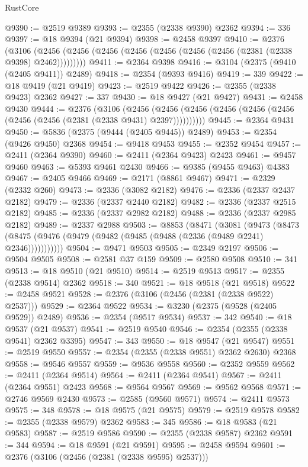\begin{lexlean}{RustCore}
\begin{coremodule}
@9390 := @2519 @9389
@9393 := @2355 (@2338 @9390) @2362
@9394 := 336
@9397 := @18 @9394 (@21 @9394)
@9398 := @2458 @9397
@9410 := @2376
    (@3106 (@2456 (@2456 (@2456 (@2456 (@2456 (@2456 (@2456 (@2381 (@2338 @9398) @2462)))))))))
@9411 := @2364 @9398
@9416 := @3104 (@2375 (@9410 (@2405 @9411)) @2489)
@9418 := @2354 (@9393 @9416)
@9419 := 339
@9422 := @18 @9419 (@21 @9419)
@9423 := @2519 @9422
@9426 := @2355 (@2338 @9423) @2362
@9427 := 337
@9430 := @18 @9427 (@21 @9427)
@9431 := @2458 @9430
@9444 := @2376
    (@3106
      (@2456 (@2456 (@2456 (@2456 (@2456 (@2456 (@2456 (@2456 (@2381 (@2338 @9431) @2397))))))))))
@9445 := @2364 @9431
@9450 := @5836 (@2375 (@9444 (@2405 @9445)) @2489)
@9453 := @2354 (@9426 @9450) @2368
@9454 := @9418 @9453
@9455 := @2352 @9454
@9457 := @2411 (@2364 @9390)
@9460 := @2411 (@2364 @9423) @2423
@9461 := @9457 @9460
@9463 := @5393 @9461 @2430
@9466 := @9385 (@9455 @9463) @4383
@9467 := @2405 @9466
@9469 := @2171 (@8861 @9467)
@9471 := @2329 (@2332 @260)
@9473 := @2336 (@3082 @2182)
@9476 := @2336 (@2337 @2437 @2182)
@9479 := @2336 (@2337 @2440 @2182)
@9482 := @2336 (@2337 @2515 @2182)
@9485 := @2336 (@2337 @2982 @2182)
@9488 := @2336 (@2337 @2985 @2182)
@9489 := @2337 @2988
@9503 := @8853
    (@8471
      (@3081
        (@9473
          (@8473 (@8475 (@9476 (@9479 (@9482 (@9485 (@9488 (@2336 (@9489 @2241) @2346)))))))))))
@9504 := @9471 @9503
@9505 := @2349 @2197
@9506 := @9504 @9505
@9508 := @2581 @37 @159
@9509 := @2580 @9508
@9510 := 341
@9513 := @18 @9510 (@21 @9510)
@9514 := @2519 @9513
@9517 := @2355 (@2338 @9514) @2362
@9518 := 340
@9521 := @18 @9518 (@21 @9518)
@9522 := @2458 @9521
@9528 := @2376 (@3106 (@2456 (@2381 (@2338 @9522) @2537)))
@9529 := @2364 @9522
@9534 := @3230 (@2375 (@9528 (@2405 @9529)) @2489)
@9536 := @2354 (@9517 @9534)
@9537 := 342
@9540 := @18 @9537 (@21 @9537)
@9541 := @2519 @9540
@9546 := @2354 (@2355 (@2338 @9541) @2362 @3395)
@9547 := 343
@9550 := @18 @9547 (@21 @9547)
@9551 := @2519 @9550
@9557 := @2354 (@2355 (@2338 @9551) @2362 @2630) @2368
@9558 := @9546 @9557
@9559 := @9536 @9558
@9560 := @2352 @9559
@9562 := @2411 (@2364 @9514)
@9564 := @2411 (@2364 @9541)
@9567 := @2411 (@2364 @9551) @2423
@9568 := @9564 @9567
@9569 := @9562 @9568
@9571 := @2746 @9569 @2430
@9573 := @2585 (@9560 @9571)
@9574 := @2411 @9573
@9575 := 348
@9578 := @18 @9575 (@21 @9575)
@9579 := @2519 @9578
@9582 := @2355 (@2338 @9579) @2362
@9583 := 345
@9586 := @18 @9583 (@21 @9583)
@9587 := @2519 @9586
@9590 := @2355 (@2338 @9587) @2362
@9591 := 344
@9594 := @18 @9591 (@21 @9591)
@9595 := @2458 @9594
@9601 := @2376 (@3106 (@2456 (@2381 (@2338 @9595) @2537)))

\end{coremodule}
\end{lexlean}
